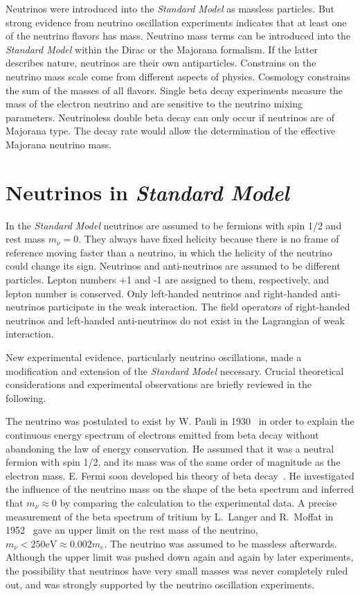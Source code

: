 Neutrinos were introduced into the \emph{Standard Model} as massless particles. But strong evidence from neutrino oscillation experiments indicates that at least one of the neutrino flavors has mass. Neutrino mass terms can be introduced into the \emph{Standard Model} within the Dirac or the Majorana formalism. If the latter describes nature, neutrinos are their own antiparticles. Constrains on the neutrino mass scale come from different aspects of physics. Cosmology constrains the sum of the masses of all flavors. Single beta decay experiments measure the mass of the electron neutrino and are sensitive to the neutrino mixing parameters. Neutrinoless double beta decay can only occur if neutrinos are of Majorana type. The decay rate would allow the determination of the effective Majorana neutrino mass.

\section{Neutrinos in \emph{Standard Model}}
\label{sec:sm}
In the \emph{Standard Model} neutrinos are assumed to be fermions with spin 1/2 and rest mass $m_\nu=0$. They always have fixed helicity because there is no frame of reference moving faster than a neutrino, in which the helicity of the neutrino could change its sign. Neutrinos and anti-neutrinos are assumed to be different particles. Lepton numbers +1 and -1 are assigned to them, respectively, and lepton number is conserved. Only left-handed neutrinos and right-handed anti-neutrinos participate in the weak interaction. The field operators of right-handed neutrinos and left-handed anti-neutrinos do not exist in the Lagrangian of weak interaction.

New experimental evidence, particularly neutrino oscillations, made a modification and extension of the \emph{Standard Model} necessary. Crucial theoretical considerations and experimental observations are briefly reviewed in the following.

The neutrino was postulated to exist by W. Pauli in 1930~\cite{Pau30} in order to explain the continuous energy spectrum of electrons emitted from beta decay without abandoning the law of energy conservation. He assumed that it was a neutral fermion with spin 1/2, and its mass was of the same order of magnitude as the electron mass. E.  Fermi soon developed his theory of beta decay~\cite{Fer33,Fer34}. He investigated the influence of the neutrino mass on the shape of the beta spectrum and inferred that $m_\nu \approx 0$ by comparing the calculation to the experimental data. A precise measurement of the beta spectrum of tritium by L.~Langer and R.~Moffat in 1952~\cite{Lan52} gave an upper limit on the rest mass of the neutrino, $m_\nu < 250 \mbox{eV} \approx 0.002m_e$. The neutrino was assumed to be massless afterwards. Although the upper limit was pushed down again and again by later experiments, the possibility that neutrinos have very small masses was never completely ruled out, and was strongly supported by the neutrino oscillation experiments.

